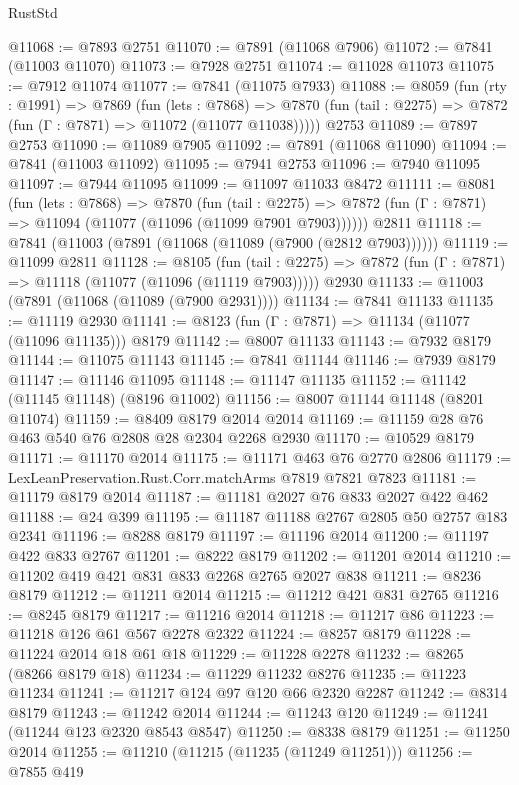 \begin{lexlean}{RustStd}
\begin{coremodule}
{\begin{coremodule}
{{{{{{{{{{{{{{{{{{{{{{{{{{{{{{{{{{{{{{{{{{{{{{{{{{{{{{@11068 := @7893 @2751
@11070 := @7891 (@11068 @7906)
@11072 := @7841 (@11003 @11070)
@11073 := @7928 @2751
@11074 := @11028 @11073
@11075 := @7912 @11074
@11077 := @7841 (@11075 @7933)
@11088 := @8059
    (fun (rty : @1991) =>
    @7869
      (fun (lets : @7868) =>
      @7870 (fun (tail : @2275) => @7872 (fun (Γ : @7871) => @11072 (@11077 @11038)))))
    @2753
@11089 := @7897 @2753
@11090 := @11089 @7905
@11092 := @7891 (@11068 @11090)
@11094 := @7841 (@11003 @11092)
@11095 := @7941 @2753
@11096 := @7940 @11095
@11097 := @7944 @11095
@11099 := @11097 @11033 @8472
@11111 := @8081
    (fun (lets : @7868) =>
    @7870
      (fun (tail : @2275) =>
      @7872 (fun (Γ : @7871) => @11094 (@11077 (@11096 (@11099 @7901 @7903))))))
    @2811
@11118 := @7841 (@11003 (@7891 (@11068 (@11089 (@7900 (@2812 @7903))))))
@11119 := @11099 @2811
@11128 := @8105
    (fun (tail : @2275) => @7872 (fun (Γ : @7871) => @11118 (@11077 (@11096 (@11119 @7903)))))
    @2930
@11133 := @11003 (@7891 (@11068 (@11089 (@7900 @2931))))
@11134 := @7841 @11133
@11135 := @11119 @2930
@11141 := @8123 (fun (Γ : @7871) => @11134 (@11077 (@11096 @11135))) @8179
@11142 := @8007 @11133
@11143 := @7932 @8179
@11144 := @11075 @11143
@11145 := @7841 @11144
@11146 := @7939 @8179
@11147 := @11146 @11095
@11148 := @11147 @11135
@11152 := @11142 (@11145 @11148) (@8196 @11002)
@11156 := @8007 @11144 @11148 (@8201 @11074)
@11159 := @8409 @8179 @2014 @2014
@11169 := @11159 @28 @76 @463 @540 @76 @2808 @28 @2304 @2268 @2930
@11170 := @10529 @8179
@11171 := @11170 @2014
@11175 := @11171 @463 @76 @2770 @2806
@11179 := LexLeanPreservation.Rust.Corr.matchArms @7819 @7821 @7823
@11181 := @11179 @8179 @2014
@11187 := @11181 @2027 @76 @833 @2027 @422 @462
@11188 := @24 @399
@11195 := @11187 @11188 @2767 @2805 @50 @2757 @183 @2341
@11196 := @8288 @8179
@11197 := @11196 @2014
@11200 := @11197 @422 @833 @2767
@11201 := @8222 @8179
@11202 := @11201 @2014
@11210 := @11202 @419 @421 @831 @833 @2268 @2765 @2027 @838
@11211 := @8236 @8179
@11212 := @11211 @2014
@11215 := @11212 @421 @831 @2765
@11216 := @8245 @8179
@11217 := @11216 @2014
@11218 := @11217 @86
@11223 := @11218 @126 @61 @567 @2278 @2322
@11224 := @8257 @8179
@11228 := @11224 @2014 @18 @61 @18
@11229 := @11228 @2278
@11232 := @8265 (@8266 @8179 @18)
@11234 := @11229 @11232 @8276
@11235 := @11223 @11234
@11241 := @11217 @124 @97 @120 @66 @2320 @2287
@11242 := @8314 @8179
@11243 := @11242 @2014
@11244 := @11243 @120
@11249 := @11241 (@11244 @123 @2320 @8543 @8547)
@11250 := @8338 @8179
@11251 := @11250 @2014
@11255 := @11210 (@11215 (@11235 (@11249 @11251)))
@11256 := @7855 @419
}}}}}}}}}}}}}}}}}}}}}}}}}}}}}}}}}}}}}}}}}}}}}}}}}}}}}}
\end{coremodule}}
\end{coremodule}
\end{lexlean}
